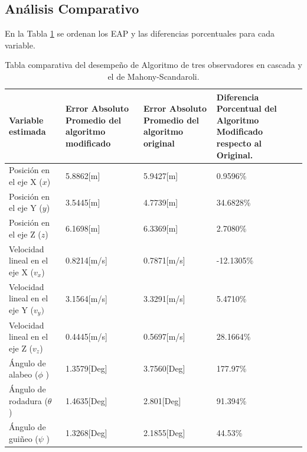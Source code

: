 \documentclass[conference]{IEEEtran}
\begin{document}
\subsection{Análisis Comparativo}
En la Tabla \ref{resultados_tb1} se ordenan los EAP y las diferencias porcentuales para cada variable.\par
%
\begin{table}[!t]
\caption{Tabla comparativa del desempeño de Algoritmo de tres observadores en cascada y el de Mahony-Scandaroli.}
\label{resultados_tb1}
\begin{center}
\begin{tabular}{|p{0.6in}|p{0.7in}|p{0.7in}|p{0.7in}|} \hline
\textbf{Variable estimada}&\small\textbf{Error Absoluto Promedio del algoritmo modificado}&\small\textbf{Error Absoluto Promedio del algoritmo original}&\small\textbf{Diferencia Porcentual del Algoritmo Modificado respecto al Original.} \\ \hline
Posición en el eje X ($x$) &5.8862[m]&5.9427[m]&0.9596\%\\ \hline
Posición en el eje Y ($y$) &3.5445[m]&4.7739[m]&34.6828\%\\ \hline
Posición en el eje Z ($z$)&6.1698[m]&6.3369[m]&2.7080\%\\ \hline
Velocidad lineal en el eje X ($v_x$) &0.8214[m/s]&0.7871[m/s]&{-12.1305\%}\\ \hline
Velocidad lineal en el eje Y ($v_y)$&3.1564[m/s]&3.3291[m/s]&5.4710\%\\ \hline
Velocidad lineal en el eje Z ($v_z$)&0.4445[m/s]&0.5697[m/s]&28.1664\%\\ \hline
Ángulo de alabeo ($\phi$ )&1.3579[Deg]&3.7560[Deg]&177.97\%\\ \hline
Ángulo de rodadura ($\theta$ )&1.4635[Deg]&2.801[Deg]&91.394\%\\ \hline
Ángulo de guiñeo ($\psi$ )&1.3268[Deg]&2.1855[Deg]&44.53\%\\ \hline
\end{tabular}
\end{center}
\end{table}
\end{document}

